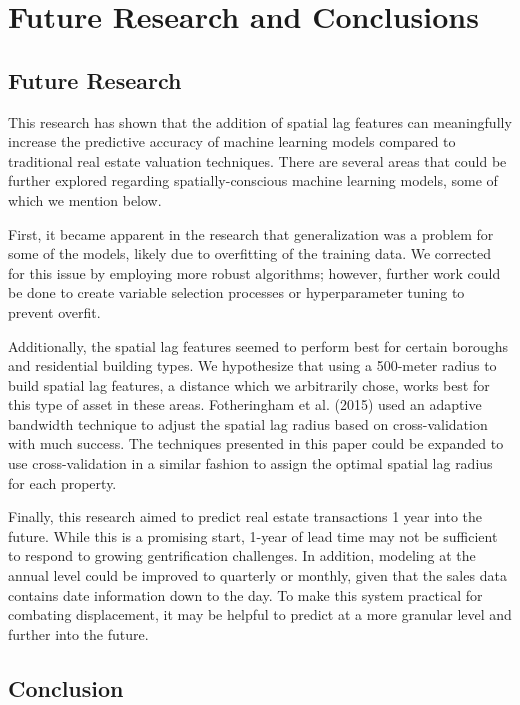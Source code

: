 \documentclass[12pt,]{article}
\begin{document}
\hypertarget{future-research-and-conclusions}{%
\section{Future Research and
Conclusions}\label{future-research-and-conclusions}}

\hypertarget{future-research}{%
\subsection{Future Research}\label{future-research}}

This research has shown that the addition of spatial lag features can
meaningfully increase the predictive accuracy of machine learning models
compared to traditional real estate valuation techniques. There are
several areas that could be further explored regarding
spatially-conscious machine learning models, some of which we mention
below.

First, it became apparent in the research that generalization was a
problem for some of the models, likely due to overfitting of the
training data. We corrected for this issue by employing more robust
algorithms; however, further work could be done to create variable
selection processes or hyperparameter tuning to prevent overfit.

Additionally, the spatial lag features seemed to perform best for
certain boroughs and residential building types. We hypothesize that
using a 500-meter radius to build spatial lag features, a distance which
we arbitrarily chose, works best for this type of asset in these areas.
Fotheringham et al. (2015) used an adaptive bandwidth technique to
adjust the spatial lag radius based on cross-validation with much
success. The techniques presented in this paper could be expanded to use
cross-validation in a similar fashion to assign the optimal spatial lag
radius for each property.

Finally, this research aimed to predict real estate transactions 1 year
into the future. While this is a promising start, 1-year of lead time
may not be sufficient to respond to growing gentrification challenges.
In addition, modeling at the annual level could be improved to quarterly
or monthly, given that the sales data contains date information down to
the day. To make this system practical for combating displacement, it
may be helpful to predict at a more granular level and further into the
future.

\hypertarget{conclusion}{%
\subsection{Conclusion}\label{conclusion}}
\end{document}
